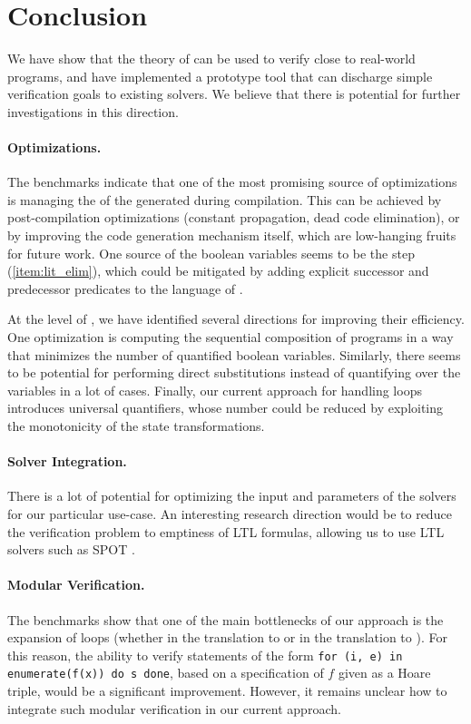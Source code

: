 \section{Conclusion}
\label{sec:conclusion}

We have show that the theory of  can be used to
verify close to real-world programs, and have implemented a prototype tool that
can discharge simple verification goals to existing solvers. We believe that
there is potential for further investigations in this direction.

\paragraph{Optimizations.} The benchmarks indicate that one of the most
promising source of optimizations is managing the  of the
generated  during compilation. This can be achieved by
post-compilation optimizations (constant propagation, dead code elimination),
or by improving the code generation mechanism itself, which are low-hanging
fruits for future work. One source of the boolean variables seems to be the
 step (\ref{item:lit_elim}), which could be
mitigated by adding explicit successor and predecessor predicates to the
language of .

At the level of , we have identified several
directions for improving their efficiency. One optimization is computing the
sequential composition of programs in a way that minimizes the number of
quantified boolean variables. Similarly, there seems to be potential for
performing direct substitutions instead of quantifying over the variables in a
lot of cases. Finally, our current approach for handling loops introduces
universal quantifiers, whose number could be reduced by exploiting the
monotonicity of the state transformations.
    
\paragraph{Solver Integration.} There is a lot of potential for optimizing the
input and parameters of the solvers for our particular use-case. An interesting
research direction would be to reduce the verification problem to emptiness of
LTL formulas, allowing us to use LTL solvers such as SPOT \cite{SPOT}.

\paragraph{Modular Verification.} The benchmarks show that one of the main
bottlenecks of our approach is the expansion of loops (whether in the
translation to  or in the translation to
). For this reason, the ability to verify
statements of the form \texttt{for (i, e) in enumerate(f(x)) do s done}, based
on a specification of $f$ given as a Hoare triple, would be a significant
improvement. However, it remains unclear how to integrate such modular
verification in our current approach.

